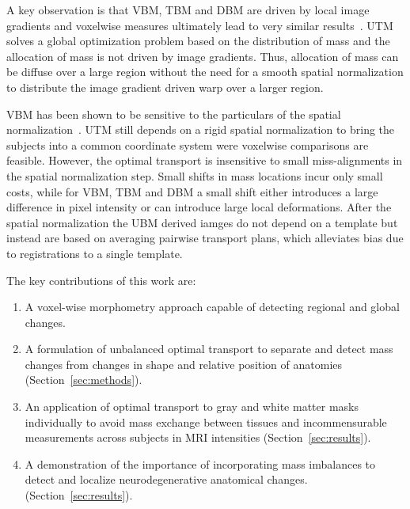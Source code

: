 \documentclass{llncs}
\begin{document}
A key observation is that VBM, TBM and DBM are driven by local image gradients
and voxelwise measures ultimately lead to very similar
results~\cite[Chaper~6]{frackowiak2004human}.  UTM solves a global optimization
problem based on the distribution of mass and the allocation of mass is not
driven by image gradients. Thus, allocation of mass can be diffuse over a large
region without the need for a smooth spatial normalization to distribute the
image gradient driven warp over a larger region. 

VBM has been shown to be sensitive to the particulars of the spatial
normalization~\cite{bookstein2001voxel,davatzikos2004voxel}. UTM still depends
on a rigid spatial normalization to bring the subjects into a common coordinate
system were voxelwise comparisons are feasible. However, the optimal transport
is insensitive to small miss-alignments in the spatial normalization step.
Small shifts in mass locations incur only small costs, while for VBM, TBM and
DBM a small shift either introduces a large difference in pixel intensity or
can introduce large local deformations.  After the spatial normalization the
UBM derived iamges do not depend on a template but instead are based on
averaging pairwise transport plans, which alleviates bias due to registrations
to a single template. 


The key contributions of this work are:
\vspace{-1mm}
\begin{enumerate}
\item A voxel-wise morphometry approach capable of detecting regional and
  global changes.  
\item A formulation of unbalanced optimal transport to separate and detect mass
  changes from changes in shape and relative position of anatomies
  (Section~\ref{sec:methods}).
\item An application of optimal transport to gray and white matter masks
  individually to avoid mass exchange between tissues and incommensurable
  measurements across subjects in MRI intensities (Section~\ref{sec:results}).
\item A demonstration of the importance of incorporating mass imbalances to
  detect and localize neurodegenerative anatomical changes.
  (Section~\ref{sec:results}).  
\end{enumerate}
\end{document}
